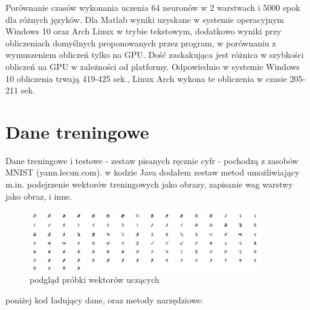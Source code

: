 Porównanie czasów wykonania uczenia 64 neuronów w 2 warstwach i 5000 epok dla różnych języków. 
Dla Matlab wyniki uzyskane w systemie operacyjnym Windows 10 oraz Arch Linux w trybie tekstowym, dodatkowo wyniki przy obliczeniach domyślnych proponowanych przez program, w porównaniu z wymuszeniem obliczeń tylko na GPU. Dość zaskakująca jest różnica w szybkości obliczeń na GPU w zależności od platformy. Odpowiednio w systemie Windows 10 obliczenia trwają 419-425 sek., Linux Arch wykona te obliczenia w czasie 205-211 sek. 
\section{Dane treningowe}
Dane treningowe i testowe - zestaw pisanych ręcznie cyfr - pochodzą z zasobów MNIST (yann.lecun.com). w kodzie Java dodałem zestaw metod umożliwiający m.in. podejrzenie wektorów treningowych jako obrazy, zapisanie wag warstwy jako obraz, i inne.

\begin{figure}[h]
	\centering \includegraphics[width=0.9\textwidth]{gfx/mnist_prev.png} 
	\caption{ podgląd próbki wektorów uczących}
	\label{rys:podglad_mnist}
\end{figure}

poniżej kod ładujący dane, oraz metody narzędziowe:

